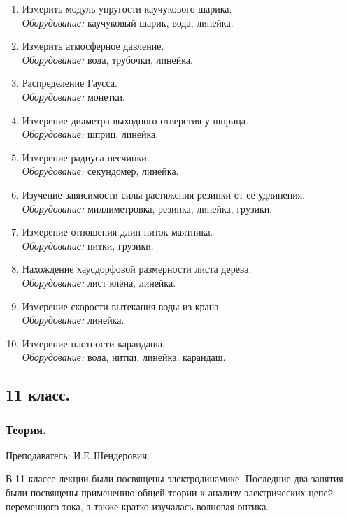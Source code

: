 \documentclass[12pt,a4paper,oneside,draft]{scrartcl}
\begin{document}
\begin{enumerate}
\item Измерить модуль упругости каучукового шарика. \\
  \textit{Оборудование:} каучуковый шарик, вода, линейка.
\item Измерить атмосферное давление. \\ \textit{Оборудование:} вода, трубочки, линейка.
\item Распределение Гаусса. \\ \textit{Оборудование:} монетки.
\item Измерение диаметра выходного отверстия у шприца. \\
  \textit{Оборудование:} шприц, линейка.
\item Измерение радиуса песчинки. \\ \textit{Оборудование:}
  секундомер, линейка.
\item Изучение зависимости силы растяжения резинки от её удлинения. \\
  \textit{Оборудование:} миллиметровка, резинка, линейка, грузики.
\item Измерение отношения длин ниток маятника. \\ \textit{Оборудование:} нитки,
  грузики.
\item Нахождение хаусдорфовой размерности листа дерева. \\
  \textit{Оборудование:} лист клёна, линейка.
\item Измерение скорости вытекания воды из крана. \\
  \textit{Оборудование:} линейка.
\item Измерение плотности карандаша. \\ \textit{Оборудование:} вода,
  нитки, линейка, карандаш. 
\end{enumerate}

\subsection{11 класс.}
\label{sec:daily_11}

\subsubsection{Теория.}
\label{sec:daily_11_th}

\textsf{Преподаватель: И.Е.\,Шендерович.}
\smallskip

В 11 классе лекции были посвящены электродинамике. Последние два
занятия были посвящены применению общей теории к анализу электрических
цепей переменного тока, а также кратко изучалась волновая оптика. 
\end{document}
